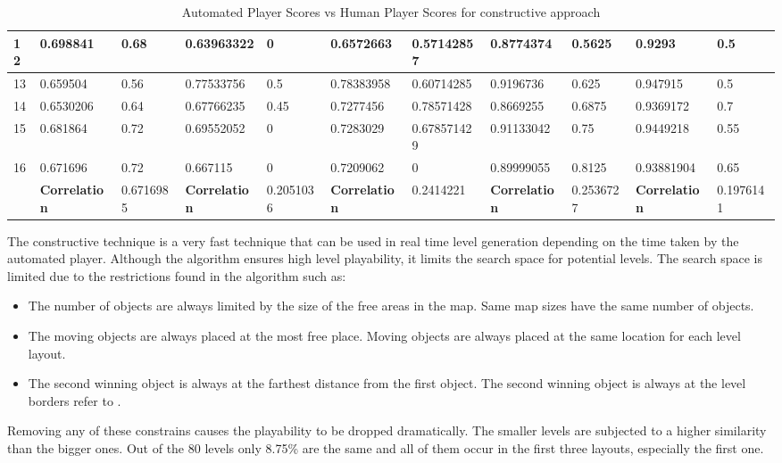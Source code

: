 \begin{landscape}
\begin{table}[!ht]
\begin{tabular}{|p{0.5in}|p{0.75in}|p{0.75in}|p{0.75in}|p{0.75in}|p{0.75in}|p{0.75in}|p{0.75in}|p{0.75in}|p{0.75in}|p{0.75in}|}
		\hline
		12 & 0.698841 & 0.68 & 0.63963322 & 0 & 0.6572663 & 0.57142857 & 0.8774374 & 0.5625 & 0.9293 & 0.5\\
		\hline
		13 & 0.659504 & 0.56 & 0.77533756 & 0.5 & 0.78383958 & 0.60714285 & 0.9196736 & 0.625 & 0.947915 & 0.5\\
		\hline
		14 & 0.6530206 & 0.64 & 0.67766235 & 0.45 & 0.7277456 & 0.78571428 & 0.8669255 & 0.6875 & 0.9369172 & 0.7\\
		\hline
		15 & 0.681864 & 0.72 & 0.69552052 & 0 & 0.7283029 & 0.678571429 & 0.91133042 & 0.75 & 0.9449218 & 0.55\\
		\hline
		16 & 0.671696 & 0.72 & 0.667115 & 0 & 0.7209062 & 0 & 0.89999055 & 0.8125 & 0.93881904 & 0.65\\
		\hline
		 & \textbf{Correlation} & 0.6716985 & \textbf{Correlation} & 0.2051036 & \textbf{Correlation} & 0.2414221 & \textbf{Correlation} & 0.2536727 & \textbf{Correlation} & 0.1976141\\
		\hline
	\end{tabular}
	\caption{Automated Player Scores vs Human Player Scores for constructive approach}
	\label{Table:constructiveScores}
\end{table}
\end{landscape}

The constructive technique is a very fast technique that can be used in real time level generation depending on the time taken by the automated player. Although the algorithm ensures high level playability, it limits the search space for potential levels. The search space is limited due to the restrictions found in the algorithm such as:
\begin{itemize} \itemsep0pt \parskip0pt 
	\item The number of objects are always limited by the size of the free areas in the map. Same map sizes have the same number of objects.
	\item The moving objects are always placed at the most free place. Moving objects are always placed at the same location for each level layout.
	\item The second winning object is always at the farthest distance from the first object. The second winning object is always at the level borders refer to .
\end{itemize}

Removing any of these constrains causes the playability to be dropped dramatically. The smaller levels are subjected to a higher similarity than the bigger ones. Out of the 80 levels only 8.75\% are the same and all of them occur in the first three layouts, especially the first one.

